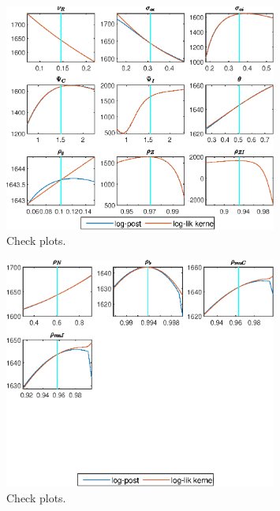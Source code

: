 \begin{figure}[H]
\centering 
\includegraphics[width=0.80\textwidth]{BRS_sectoral_wo_gmf/graphs/BRS_sectoral_wo_gmf_CheckPlots3}
\caption{Check plots.}\label{Fig:CheckPlots:3}
\end{figure}
 
\begin{figure}[H]
\centering 
\includegraphics[width=0.80\textwidth]{BRS_sectoral_wo_gmf/graphs/BRS_sectoral_wo_gmf_CheckPlots4}
\caption{Check plots.}\label{Fig:CheckPlots:4}
\end{figure}
 
